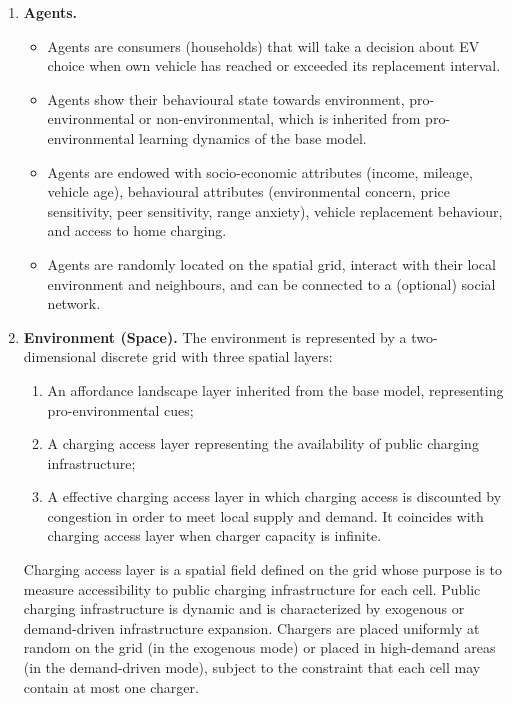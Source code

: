 \documentclass[11pt]{article}
\begin{document}
\begin{enumerate}
\item \textbf{Agents.}
  \begin{itemize}
  \item Agents are consumers (households) that will take a decision about EV
    choice when own vehicle has reached or exceeded its replacement
    interval.
  \item Agents show their behavioural state towards environment,
    pro-environmental or non-environmental, which is inherited from
    pro-environmental learning dynamics of the base model.
  \item Agents are endowed with socio-economic attributes (income, mileage,
    vehicle age), behavioural attributes (environmental concern, price
    sensitivity, peer sensitivity, range anxiety), vehicle replacement
    behaviour, and access to home charging.
  \item Agents are randomly located on the spatial grid, interact with their
    local environment and neighbours, and can be connected to a (optional)
    social network.
  \end{itemize}

\item \textbf{Environment (Space).}
  The environment is represented by a two-dimensional discrete grid with
  three spatial layers:
  \begin{enumerate}
  \item[(i)] An affordance landscape layer inherited from the base model,
    representing pro-environmental cues;
  \item[(ii)] A charging access layer representing the availability of
    public charging infrastructure;
  \item[(iii)] A effective charging access layer in which charging access is
    discounted by congestion in order to meet local supply and demand. It
    coincides with charging access layer when charger capacity is infinite.
  \end{enumerate}

  Charging access layer is a spatial field defined on the grid whose purpose
  is to measure accessibility to public charging infrastructure for each
  cell. Public charging infrastructure is dynamic and is characterized by
  exogenous or demand-driven infrastructure expansion. Chargers are placed
  uniformly at random on the grid (in the exogenous mode) or placed in
  high-demand areas (in the demand-driven mode), subject to the constraint
  that each cell may contain at most one charger.


\end{enumerate}
\end{document}
